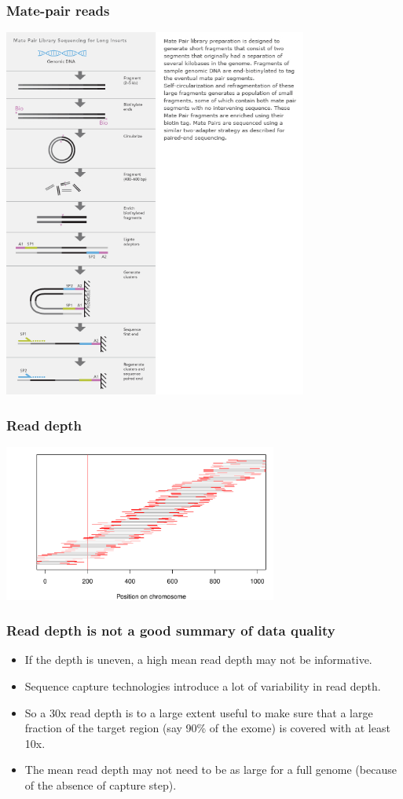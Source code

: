\documentclass{beamer}
\begin{document}
\begin{frame}
  \frametitle{Mate-pair reads}
  \includegraphics[width=10cm]{fig/mate_pair.jpg}
\end{frame}


\begin{frame}
  \frametitle{Read depth}
  \begin{center}
  \includegraphics[width=9cm]{fig/entropy_good.pdf}
  \end{center}
\end{frame}


\begin{frame}
  \frametitle{Read depth is not a good summary of data quality}
  \begin{itemize}
  \item If the depth is uneven, a high mean read depth may not be informative.
  \item Sequence capture technologies introduce a lot of variability in read depth.
  \item So a 30x read depth is to a large extent useful to make sure that a large fraction of the target region (say 90\% of the exome) is covered with at least 10x.
  \item The mean read depth may not need to be as large for a full genome (because of the absence of capture step).
  \end{itemize}
\end{frame}
\end{document}
